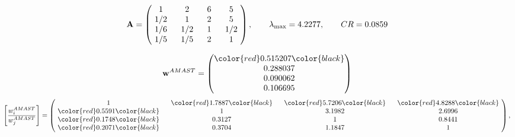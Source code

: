 \begin{example}
\begin{equation*}
\mathbf{A} =
\begin{pmatrix}
$\,\,$ 1 $\,\,$ & $\,\,$2$\,\,$ & $\,\,$6$\,\,$ & $\,\,$5 $\,\,$ \\
$\,\,$ 1/2$\,\,$ & $\,\,$ 1 $\,\,$ & $\,\,$2$\,\,$ & $\,\,$5 $\,\,$ \\
$\,\,$ 1/6$\,\,$ & $\,\,$ 1/2$\,\,$ & $\,\,$ 1 $\,\,$ & $\,\,$ 1/2 $\,\,$ \\
$\,\,$ 1/5$\,\,$ & $\,\,$ 1/5$\,\,$ & $\,\,$2$\,\,$ & $\,\,$ 1  $\,\,$ \\
\end{pmatrix},
\qquad
\lambda_{\max} =
4.2277,
\qquad
CR = 0.0859
\end{equation*}

\begin{equation*}
\mathbf{w}^{AMAST} =
\begin{pmatrix}
\color{red} 0.515207\color{black} \\
0.288037\\
0.090062\\
0.106695
\end{pmatrix}\end{equation*}
\begin{equation*}
\left[ \frac{{w}^{AMAST}_i}{{w}^{AMAST}_j} \right] =
\begin{pmatrix}
$\,\,$ 1 $\,\,$ & $\,\,$\color{red} 1.7887\color{black} $\,\,$ & $\,\,$\color{red} 5.7206\color{black} $\,\,$ & $\,\,$\color{red} 4.8288\color{black} $\,\,$ \\
$\,\,$\color{red} 0.5591\color{black} $\,\,$ & $\,\,$ 1 $\,\,$ & $\,\,$3.1982$\,\,$ & $\,\,$2.6996  $\,\,$ \\
$\,\,$\color{red} 0.1748\color{black} $\,\,$ & $\,\,$0.3127$\,\,$ & $\,\,$ 1 $\,\,$ & $\,\,$0.8441 $\,\,$ \\
$\,\,$\color{red} 0.2071\color{black} $\,\,$ & $\,\,$0.3704$\,\,$ & $\,\,$1.1847$\,\,$ & $\,\,$ 1  $\,\,$ \\
\end{pmatrix},
\end{equation*}


\end{example}
